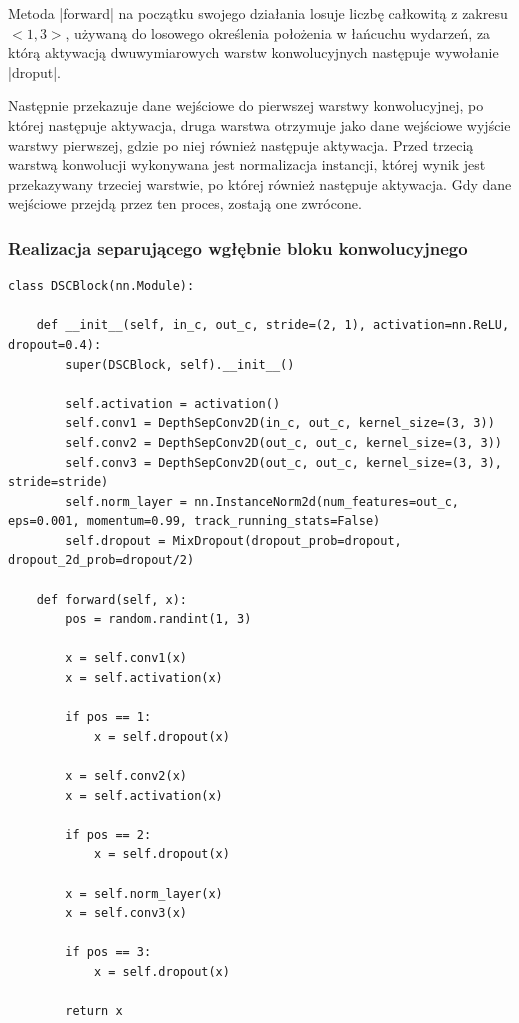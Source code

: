 Metoda \pyth|forward| na początku swojego działania losuje liczbę całkowitą z zakresu $<1, 3>$, używaną do losowego określenia położenia w łańcuchu wydarzeń, za którą aktywacją dwuwymiarowych warstw konwolucyjnych następuje wywołanie \pyth|droput|.

Następnie przekazuje dane wejściowe do pierwszej warstwy konwolucyjnej, po której następuje aktywacja, druga warstwa otrzymuje jako dane wejściowe wyjście warstwy pierwszej, gdzie po niej również następuje aktywacja. Przed trzecią warstwą konwolucji wykonywana jest normalizacja instancji, której wynik jest przekazywany trzeciej warstwie, po której również następuje aktywacja. Gdy dane wejściowe przejdą przez ten proces, zostają one zwrócone. 


\subsubsection{Realizacja separującego wgłębnie bloku konwolucyjnego} \label{DSCBlock}
\begin{lstlisting}[caption={\pyth|DSCBlock| - klasa głębokiego separującego bloku konwolucyjnego.}, label={dscblock}]
class DSCBlock(nn.Module):

	def __init__(self, in_c, out_c, stride=(2, 1), activation=nn.ReLU, dropout=0.4):
		super(DSCBlock, self).__init__()
		
		self.activation = activation()
		self.conv1 = DepthSepConv2D(in_c, out_c, kernel_size=(3, 3))
		self.conv2 = DepthSepConv2D(out_c, out_c, kernel_size=(3, 3))
		self.conv3 = DepthSepConv2D(out_c, out_c, kernel_size=(3, 3), stride=stride)
		self.norm_layer = nn.InstanceNorm2d(num_features=out_c, eps=0.001, momentum=0.99, track_running_stats=False)
		self.dropout = MixDropout(dropout_prob=dropout, dropout_2d_prob=dropout/2)
	
	def forward(self, x):
		pos = random.randint(1, 3)
		
		x = self.conv1(x)
		x = self.activation(x)
		
		if pos == 1:
			x = self.dropout(x)
		
		x = self.conv2(x)
		x = self.activation(x)
		
		if pos == 2:
			x = self.dropout(x)
		
		x = self.norm_layer(x)
		x = self.conv3(x)
		
		if pos == 3:
			x = self.dropout(x)
		
		return x
\end{lstlisting}

